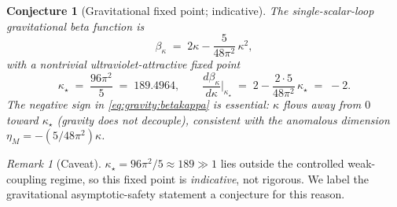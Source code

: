 \documentclass[11pt]{article}
\theoremstyle{plain}
\newtheorem{conjecture}[theorem]{Conjecture}
\theoremstyle{definition}
\theoremstyle{remark}
\newtheorem{remark}[theorem]{Remark}
\begin{document}
\begin{conjecture}[Gravitational fixed point; indicative]
\label{conj:gravity:as}
\label{thm:gravity:beta}
The single-scalar-loop gravitational beta function is
\begin{equation}\label{eq:gravity:betakappa}
  \beta_{\kappa} \;=\; 2\kappa - \frac{5}{48\pi^{2}}\,\kappa^{2},
\end{equation}
with a nontrivial ultraviolet-attractive fixed point
\begin{equation}\label{eq:gravity:kappastar}
  \kappa_{\star} \;=\; \frac{96\pi^{2}}{5} \;=\; 189.4964,
  \qquad
  \frac{d\beta_{\kappa}}{d\kappa}\Big|_{\kappa_{\star}}
  \;=\; 2 - \frac{2\cdot 5}{48\pi^{2}}\,\kappa_{\star}
  \;=\; -2 .
\end{equation}
The negative sign in \eqref{eq:gravity:betakappa} is essential: $\kappa$
flows \emph{away} from $0$ toward $\kappa_{\star}$ (gravity does \emph{not}
decouple), consistent with the anomalous dimension
$\eta_{M}=-(5/48\pi^{2})\kappa$.
\end{conjecture}

\begin{remark}[Caveat]
\label{rmk:gravity:caveat}
$\kappa_{\star}=96\pi^{2}/5\approx 189\gg 1$ lies outside the controlled
weak-coupling regime, so this fixed point is \emph{indicative}, not
rigorous. We label the gravitational asymptotic-safety statement a
conjecture for this reason.
\end{remark}
\end{document}
